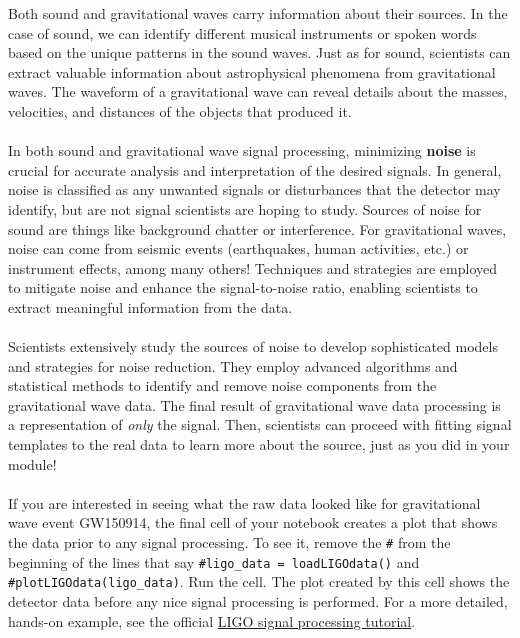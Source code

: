 \documentclass[14pt]{article}
\begin{document}
Both sound and gravitational waves carry information about their sources. In the case of sound, we can identify different musical instruments or spoken words based on the unique patterns in the sound waves. Just as for sound, scientists can extract valuable information about astrophysical phenomena from gravitational waves. The waveform of a gravitational wave can reveal details about the masses, velocities, and distances of the objects that produced it. 
\\\\
\noindent In both sound and gravitational wave signal processing, minimizing \textbf{noise} is crucial for accurate analysis and interpretation of the desired signals. In general, noise is classified as any unwanted signals or disturbances that the detector may identify, but are not signal scientists are hoping to study. Sources of noise for sound are things like background chatter or interference. For gravitational waves, noise can come from seismic events (earthquakes, human activities, etc.) or instrument effects, among many others! Techniques and strategies are employed to mitigate noise and enhance the signal-to-noise ratio, enabling scientists to extract meaningful information from the data.
\\\\
\noindent Scientists extensively study the sources of noise to develop sophisticated models and strategies for noise reduction. They employ advanced algorithms and statistical methods to identify and remove noise components from the gravitational wave data. The final result of gravitational wave data processing is a representation of \textit{only} the signal. Then, scientists can proceed with fitting signal templates to the real data to learn more about the source, just as you did in your module! 
\\\\
\noindent If you are interested in seeing what the raw data looked like for gravitational wave event GW150914, the final cell of your notebook creates a plot that shows the data prior to any signal processing. To see it, remove the \texttt{\#} from the beginning of the lines that say \texttt{\#ligo\_data = loadLIGOdata()} and \texttt{\#plotLIGOdata(ligo\_data)}. Run the cell. The plot created by this cell shows the detector data before any nice signal processing is performed. For a more detailed, hands-on example, see the official \href{https://gwfilter.streamlit.app/}{LIGO signal processing tutorial}.
\end{document}
